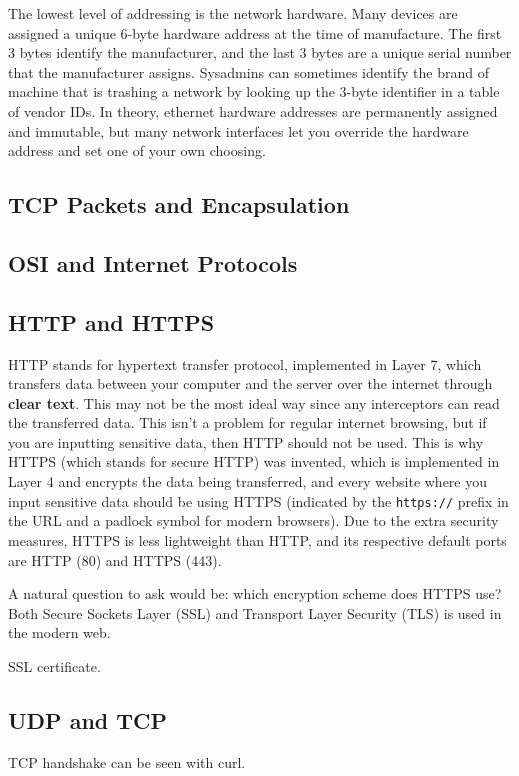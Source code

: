 \documentclass{article}
\begin{document}
      The lowest level of addressing is the network hardware. Many devices are assigned a unique 6-byte hardware address at the time of manufacture. The first 3 bytes identify the manufacturer, and the last 3 bytes are a unique serial number that the manufacturer assigns. Sysadmins can sometimes identify the brand of machine that is trashing a network by looking up the 3-byte identifier in a table of vendor IDs. In theory, ethernet hardware addresses are permanently assigned and immutable, but many network interfaces let you override the hardware address and set one of your own choosing. 

  \subsection{TCP Packets and Encapsulation}

  \subsection{OSI and Internet Protocols}
  

  \subsection{HTTP and HTTPS} 

    HTTP stands for hypertext transfer protocol, implemented in Layer 7, which transfers data between your computer and the server over the internet through \textbf{clear text}. This may not be the most ideal way since any interceptors can read the transferred data. This isn't a problem for regular internet browsing, but if you are inputting sensitive data, then HTTP should not be used. This is why HTTPS (which stands for secure HTTP) was invented, which  is implemented in Layer 4 and encrypts the data being transferred, and every website where you input sensitive data should be using HTTPS (indicated by the \texttt{https://} prefix in the URL and a padlock symbol for modern browsers). Due to the extra security measures, HTTPS is less lightweight than HTTP, and its respective default ports are HTTP (80) and HTTPS (443).  

    A natural question to ask would be: which encryption scheme does HTTPS use? Both Secure Sockets Layer (SSL) and Transport Layer Security (TLS) is used in the modern web. 

    SSL certificate. 

    
  \subsection{UDP and TCP}

    TCP handshake can be seen with curl. 
\end{document}
